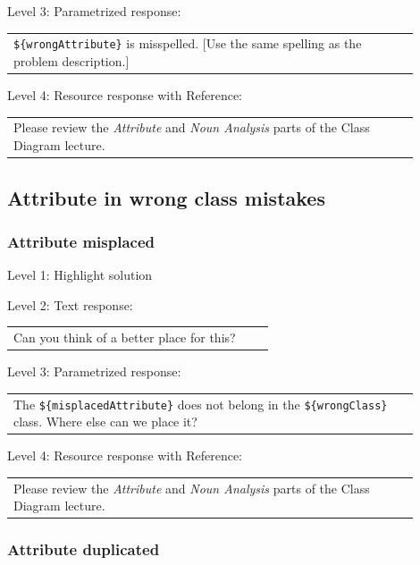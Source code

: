 \noindent Level 3: Parametrized response: \medskip

\begin{tabular}{|p{0.9\linewidth}}
\verb|${wrongAttribute}| is misspelled. [Use the same spelling as the problem description.]
\end{tabular} \medskip

\noindent Level 4: Resource response with Reference: \medskip

\begin{tabular}{|p{0.9\linewidth}}
Please review the \textit{Attribute} and \textit{Noun Analysis} parts of the Class Diagram lecture.
\end{tabular} \medskip


\subsection{Attribute in wrong class mistakes}

\subsubsection{Attribute misplaced}

\noindent Level 1: Highlight solution \medskip

\noindent Level 2: Text response: \medskip

\begin{tabular}{|p{0.9\linewidth}}
Can you think of a better place for this?
\end{tabular} \medskip

\noindent Level 3: Parametrized response: \medskip

\begin{tabular}{|p{0.9\linewidth}}
The \verb|${misplacedAttribute}| does not belong in the \verb|${wrongClass}| class. Where else can we place it?
\end{tabular} \medskip

\noindent Level 4: Resource response with Reference: \medskip

\begin{tabular}{|p{0.9\linewidth}}
Please review the \textit{Attribute} and \textit{Noun Analysis} parts of the Class Diagram lecture.
\end{tabular} \medskip


\subsubsection{Attribute duplicated}

